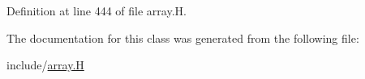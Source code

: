 Definition at line 444 of file array.\+H.



The documentation for this class was generated from the following file\+:\begin{DoxyCompactItemize}
\item 
include/\hyperlink{array_8_h}{array.\+H}\end{DoxyCompactItemize}

